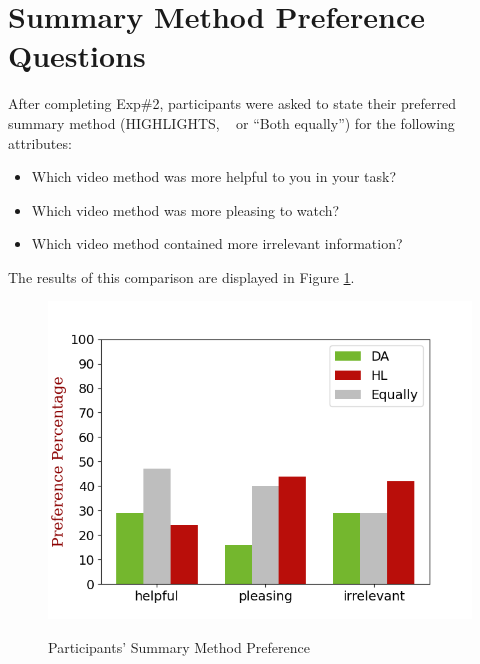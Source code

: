 \section{Summary Method Preference Questions}
After completing Exp\#2, participants were asked to state their preferred summary method (HIGHLIGHTS, \disalg~ or ``Both equally'') for the following attributes:
\begin{itemize}
	\item Which video method was more helpful to you in your task?
	\item Which video method was more pleasing to watch?
	\item Which video method contained more irrelevant information?
\end{itemize}
The results of this comparison are displayed in Figure \ref{fig: pref}.

\begin{figure}[ht]
	\centering
    \includegraphics[width=0.98\columnwidth]{images/preference.png}\\
	\caption{Participants' Summary Method Preference}
	\label{fig: pref}
\end{figure}


